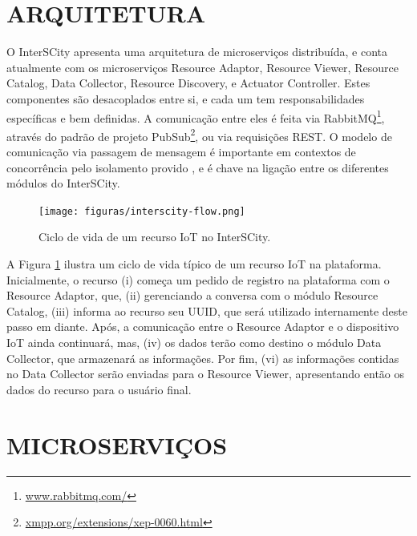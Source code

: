 \section{ARQUITETURA}

O InterSCity apresenta uma arquitetura de microserviços distribuída, e conta
atualmente com os microserviços Resource Adaptor, Resource Viewer,
Resource Catalog, Data Collector, Resource Discovery, e Actuator Controller.
Estes componentes são desacoplados entre si, e cada um tem
responsabilidades específicas e bem definidas. A comunicação entre eles é
feita via RabbitMQ\footnote{\url{www.rabbitmq.com/}}, através
do padrão de projeto PubSub\footnote{\url{xmpp.org/extensions/xep-0060.html}},
ou via requisições REST. O modelo de comunicação via passagem de mensagem é
importante em contextos de concorrência pelo isolamento provido
\cite{armstrong2003}, e é chave na ligação entre os diferentes módulos do
InterSCity.

\begin{figure}
  \centering
    \texttt{[image: figuras/interscity-flow.png]}
  \caption{Ciclo de vida de um recurso IoT no InterSCity.}
  \label{fig:interscity-lifecycle}
\end{figure}

A Figura \ref{fig:interscity-lifecycle} ilustra um ciclo de vida típico de um
recurso IoT na plataforma. Inicialmente, o recurso (i) começa um pedido de
registro na plataforma com o Resource Adaptor, que, (ii) gerenciando a conversa
com o módulo Resource Catalog, (iii) informa ao recurso seu UUID, que será
utilizado internamente deste passo em diante. Após, a comunicação entre o
Resource Adaptor e o dispositivo IoT ainda continuará, mas, (iv) os dados terão
como destino o módulo Data Collector, que armazenará as informações. Por fim,
(vi) as informações contidas no Data Collector serão enviadas para o
Resource Viewer, apresentando então os dados do recurso para o usuário final.

\section{MICROSERVIÇOS}

